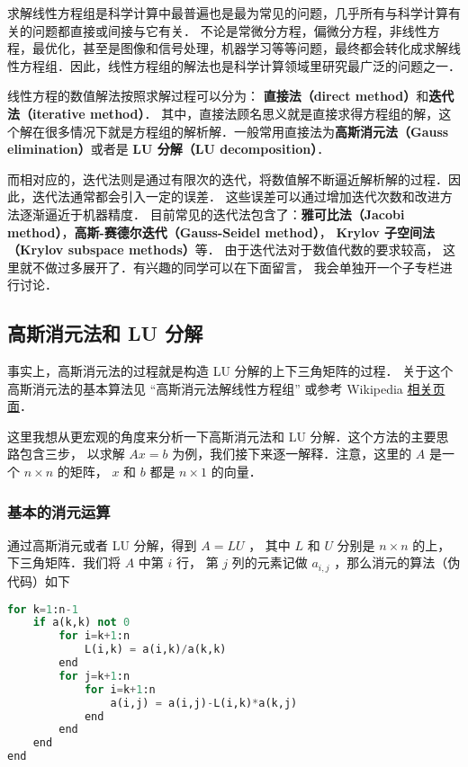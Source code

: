 

求解线性方程组是科学计算中最普遍也是最为常见的问题，几乎所有与科学计算有关的问题都直接或间接与它有关． 不论是常微分方程，偏微分方程，非线性方程，最优化，甚至是图像和信号处理，机器学习等等问题，最终都会转化成求解线性方程组．因此，线性方程组的解法也是科学计算领域里研究最广泛的问题之一．

线性方程的数值解法按照求解过程可以分为： \textbf{直接法（direct method）}和\textbf{迭代法（iterative method）}． 其中，直接法顾名思义就是直接求得方程组的解，这个解在很多情况下就是方程组的解析解．一般常用直接法为\textbf{高斯消元法（Gauss elimination）}或者是 \textbf{LU 分解（LU decomposition）}．

而相对应的，迭代法则是通过有限次的迭代，将数值解不断逼近解析解的过程．因此，迭代法通常都会引入一定的误差． 这些误差可以通过增加迭代次数和改进方法逐渐逼近于机器精度． 目前常见的迭代法包含了：\textbf{雅可比法（Jacobi method）}，\textbf{高斯-赛德尔迭代（Gauss-Seidel method）}， \textbf{Krylov 子空间法（Krylov subspace methods）}等． 由于迭代法对于数值代数的要求较高， 这里就不做过多展开了．有兴趣的同学可以在下面留言， 我会单独开一个子专栏进行讨论．

\subsection{高斯消元法和 LU 分解}

事实上，高斯消元法的过程就是构造 LU 分解的上下三角矩阵的过程． 关于这个高斯消元法的基本算法见 “高斯消元法解线性方程组” 或参考 Wikipedia \href{https://en.wikipedia.org/wiki/Gaussian_elimination}{相关页面}．

这里我想从更宏观的角度来分析一下高斯消元法和 LU 分解．这个方法的主要思路包含三步， 以求解 $Ax=b$ 为例，我们接下来逐一解释．注意，这里的 $A$  是一个 $n\times n$ 的矩阵， $x$ 和 $b$ 都是 $n\times1$ 的向量．

\subsubsection{基本的消元运算}

通过高斯消元或者 LU 分解，得到 $A=LU$ ， 其中 $L$ 和 $U $ 分别是 $n\times n$ 的上，下三角矩阵．我们将 $A$ 中第 $i$ 行， 第 $j$ 列的元素记做 $a_{i,j}$ ，那么消元的算法（伪代码）如下
\begin{lstlisting}[language=python]
for k=1:n-1
    if a(k,k) not 0
        for i=k+1:n
            L(i,k) = a(i,k)/a(k,k)
        end
        for j=k+1:n
            for i=k+1:n
                a(i,j) = a(i,j)-L(i,k)*a(k,j)
            end
        end
    end
end
\end{lstlisting}

